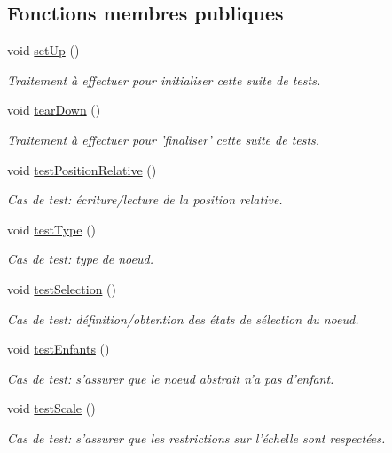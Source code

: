 \subsection*{Fonctions membres publiques}
\begin{DoxyCompactItemize}
\item 
void \hyperlink{group__inf2990_ga4d2fe388f550ba374823d09b5c8ebe77}{set\-Up} ()
\begin{DoxyCompactList}\small\item\em Traitement à effectuer pour initialiser cette suite de tests. \end{DoxyCompactList}\item 
void \hyperlink{group__inf2990_ga2c5c558ff7e40386c724a55b670af417}{tear\-Down} ()
\begin{DoxyCompactList}\small\item\em Traitement à effectuer pour 'finaliser' cette suite de tests. \end{DoxyCompactList}\item 
void \hyperlink{group__inf2990_gaed7a5423d2a3a7518aef743f17d32ccd}{test\-Position\-Relative} ()
\begin{DoxyCompactList}\small\item\em Cas de test\-: écriture/lecture de la position relative. \end{DoxyCompactList}\item 
void \hyperlink{group__inf2990_gadf554a62266cc21c7c48f6a27ad7c752}{test\-Type} ()
\begin{DoxyCompactList}\small\item\em Cas de test\-: type de noeud. \end{DoxyCompactList}\item 
void \hyperlink{group__inf2990_gac044744b04574c86418a57b39e3238ff}{test\-Selection} ()
\begin{DoxyCompactList}\small\item\em Cas de test\-: définition/obtention des états de sélection du noeud. \end{DoxyCompactList}\item 
void \hyperlink{group__inf2990_ga0e65b00620e79646a9efd8a93c4fc650}{test\-Enfants} ()
\begin{DoxyCompactList}\small\item\em Cas de test\-: s'assurer que le noeud abstrait n'a pas d'enfant. \end{DoxyCompactList}\item 
void \hyperlink{group__inf2990_gab9182c635c672eb2ade3f2b2b5043244}{test\-Scale} ()
\begin{DoxyCompactList}\small\item\em Cas de test\-: s'assurer que les restrictions sur l'échelle sont respectées. \end{DoxyCompactList}\end{DoxyCompactItemize}


